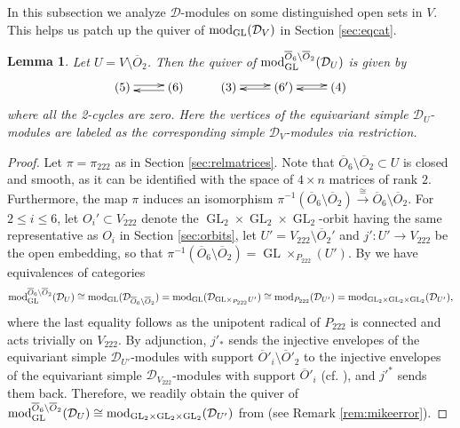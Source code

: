 \documentclass[11pt,reqno]{amsart}
\newcommand{\D}{\mathcal{D}}
\newcommand{\tn}{\textnormal}
\newcommand{\GL}{\operatorname{GL}}
\newcommand{\ol}[1]{\overline{#1}}
\newtheorem{lemma}[theorem]{Lemma}
\numberwithin{equation}{section}
\begin{document}
In this subsection we analyze $\D$-modules on some distinguished open sets in $V$. This helps us patch up the quiver of $\tn{mod}_{\GL}(\D_V)$ in Section \ref{sec:eqcat}.

\begin{lemma}\label{lem:opencat1}
Let $U= V\setminus \ol{O}_2$. Then the quiver of $\tn{mod}_{\GL}^{\ol{O}_6 \setminus \ol{O}_2}(\D_U)$ is given by
\[\xymatrix{
(5) \ar@<0.5ex>[r] & (6)  \ar@<0.5ex>[l]  & (3) \ar@<0.5ex>[r] & \ar@<0.2ex>[l] (6') \ar@<0.5ex>[r] & \ar@<0.2ex>[l] (4)
}\]
where all the 2-cycles are zero. Here the vertices of the equivariant simple $\D_U$-modules are labeled as the corresponding simple $\D_V$-modules via restriction.
\end{lemma}
\begin{proof}
Let $\pi=\pi_{222}$ as in Section \ref{sec:relmatrices}. Note that $\ol{O}_6 \setminus \ol{O}_2 \subset U$ is closed and smooth, as it can be identified with the space of $4\times n$ matrices of rank $2$. Furthermore, the map $\pi$ induces an isomorphism $\pi^{-1} (\ol{O}_6 \setminus \ol{O}_2) \xrightarrow{\,\cong\,} \ol{O}_6 \setminus \ol{O}_2$. For $2\leq i \leq 6$, let $O_i' \subset V_{222}$ denote the $\GL_2 \times \GL_2 \times \GL_2$-orbit having the same representative as $O_i$ in Section \ref{sec:orbits}, let $U' = V_{222} \setminus \ol{O}_2'$ and $j': U' \to V_{222}$ be the open embedding, so that $\pi^{-1} (\ol{O}_6 \setminus \ol{O}_2) = \GL\times_{P_{222}} (U')$. By \cite[Proposition 4.5]{lHorincz2019categories} we have equivalences of categories
\begin{equation}\label{eq:catchain}
\tn{mod}_{\GL}^{\ol{O}_6 \setminus \ol{O}_2}(\D_U) \cong \tn{mod}_{\GL}(\D_{\ol{O}_6 \setminus \ol{O}_2}) =  \tn{mod}_{\GL}(\D_{\GL\!\times_{P_{222}} U'}) \cong  \tn{mod}_{P_{222}}(\D_{U'}) = \tn{mod}_{\GL_2 \!\times \! \GL_2 \! \times \! \GL_2}(\D_{U'}),
\end{equation}
where the last equality follows as the unipotent radical of $P_{222}$ is connected and acts trivially on $V_{222}$. By adjunction, $j'_* $ sends the injective envelopes of the equivariant simple $\D_{U'}$-modules with support $\ol{O}'_i \setminus \ol{O}'_2$ to the injective envelopes of the equivariant simple $\D_{V_{222}}$-modules with support $\ol{O}'_i$ (cf. \cite[Lemma 2.4]{binary}), and $j'^*$ sends them back. Therefore, we readily obtain the quiver of $\tn{mod}_{\GL}^{\ol{O}_6 \setminus \ol{O}_2}(\D_U)\cong \tn{mod}_{\GL_2 \!\times \! \GL_2 \! \times \! \GL_2}(\D_{U'}) $ from \cite[Theorem on the Quiver Structure]{perlmancorrected} (see Remark \ref{rem:mikeerror}).
\end{proof}
\end{document}
